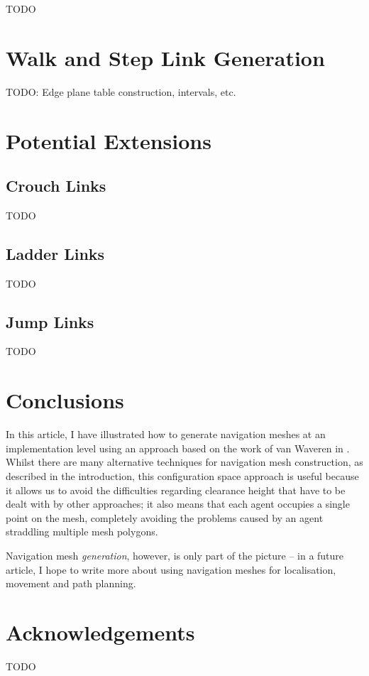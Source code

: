 \documentclass[10pt,twocolumn]{article}
\begin{document}
TODO

\section*{Walk and Step Link Generation}

TODO: Edge plane table construction, intervals, etc.

\section*{Potential Extensions}

\subsection*{Crouch Links}

TODO

\subsection*{Ladder Links}

TODO

\subsection*{Jump Links}

TODO

\section*{Conclusions}

In this article, I have illustrated how to generate navigation meshes at an implementation level using an approach based on the work of van Waveren in \cite{vanwaveren01}. Whilst there are many alternative techniques for navigation mesh construction, as described in the introduction, this configuration space approach is useful because it allows us to avoid the difficulties regarding clearance height that have to be dealt with by other approaches; it also means that each agent occupies a single point on the mesh, completely avoiding the problems caused by an agent straddling multiple mesh polygons.

Navigation mesh \emph{generation}, however, is only part of the picture -- in a future article, I hope to write more about using navigation meshes for localisation, movement and path planning.

\section*{Acknowledgements}

TODO




\end{document}
